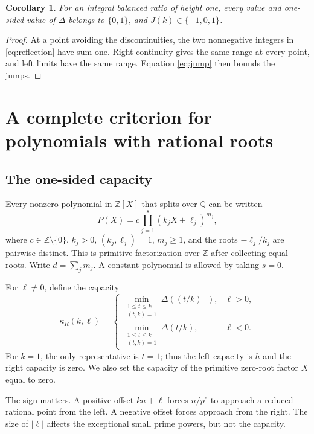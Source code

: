 \documentclass[11pt]{article}
\newtheorem{corollary}[theorem]{Corollary}
\theoremstyle{definition}
\theoremstyle{remark}
\newcommand{\Z}{\mathbb Z}
\newcommand{\Q}{\mathbb Q}
\begin{document}
\begin{corollary}\label{cor:01}
For an integral balanced ratio of height one, every value and one-sided
value of $\Delta$ belongs to $\{0,1\}$, and $J(k)\in\{-1,0,1\}$.
\end{corollary}
\begin{proof}
At a point avoiding the discontinuities, the two nonnegative integers
in \eqref{eq:reflection} have sum one. Right continuity gives the same
range at every point, and left limits have the same range. Equation
\eqref{eq:jump} then bounds the jumps.
\end{proof}

\section{A complete criterion for polynomials with rational roots}
\subsection{The one-sided capacity}
Every nonzero polynomial in $\Z[X]$ that splits over $\Q$ can be written
\begin{equation}\label{eq:Pfactor}
 P(X)=c\prod_{j=1}^s(k_jX+\ell_j)^{m_j},
\end{equation}
where $c\in\Z\setminus\{0\}$, $k_j>0$, $(k_j,\ell_j)=1$, $m_j\geq1$,
and the roots $-\ell_j/k_j$ are pairwise distinct. This is primitive
factorization over $\Z$ after collecting equal roots. Write
$d=\sum_jm_j$. A constant polynomial is allowed by taking $s=0$.

For $\ell\ne0$, define the capacity
\begin{equation}\label{eq:capacity}
 \kappa_R(k,\ell)=
 \begin{cases}
 \displaystyle\min_{\substack{1\leq t\leq k\\(t,k)=1}}
       \Delta((t/k)^-),&\ell>0,\\[2ex]
 \displaystyle\min_{\substack{1\leq t\leq k\\(t,k)=1}}
       \Delta(t/k),&\ell<0.
 \end{cases}
\end{equation}
For $k=1$, the only representative is $t=1$; thus the left capacity is
$h$ and the right capacity is zero. We also set the capacity of the
primitive zero-root factor $X$ equal to zero.

The sign matters. A positive offset $kn+\ell$ forces $n/p^e$ to
approach a reduced rational point from the left. A negative offset
forces approach from the right. The size of $|\ell|$ affects the
exceptional small prime powers, but not the capacity.
\end{document}
